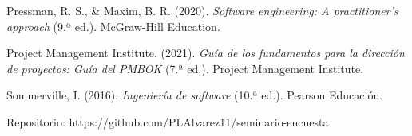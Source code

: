 \documentclass[12pt,letterpaper]{article}
\begin{document}
Pressman, R. S., \& Maxim, B. R. (2020). \textit{Software engineering: A practitioner's approach} (9.ª ed.). McGraw-Hill Education.

Project Management Institute. (2021). \textit{Guía de los fundamentos para la dirección de proyectos: Guía del PMBOK} (7.ª ed.). Project Management Institute.

Sommerville, I. (2016). \textit{Ingeniería de software} (10.ª ed.). Pearson Educación.

\vspace{0.5cm}
\noindent \small Repositorio: https://github.com/PLAlvarez11/seminario-encuesta
\end{document}
